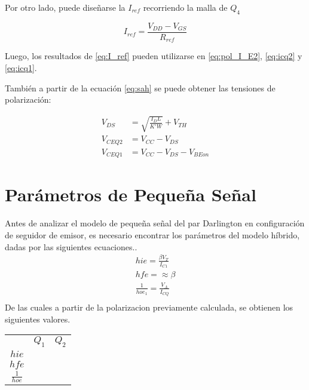 Por otro lado, puede diseñarse la $I_{ref}$ recorriendo la malla de $Q_4$

\begin{equation}
    I_{ref}=\frac{V_{DD}-V_{GS}}{R_{ref}}
    \label{eq:I_ref}
\end{equation}

Luego, los resultados de \eqref{eq:I_ref} pueden utilizarse en \eqref{eq:pol_I_E2}, \eqref{eq:icq2} y \eqref{eq:icq1}.

También a partir de la ecuación	 \eqref{eq:sah} se puede obtener las tensiones de polarización:

\begin{align}
    V_{DS} &= \sqrt{\frac{I_D L}{K' W}} + V_{TH}\\
    V_{CEQ2} &= V_{CC} - V_{DS} \\
    V_{CEQ1} &= V_{CC} - V_{DS} - V_{BEon}
\end{align}

\section{Parámetros de Pequeña Señal}

Antes de analizar el modelo de pequeña señal del par Darlington en configuración de seguidor de emisor, es necesario encontrar los parámetros del modelo híbrido, dadas por las siguientes ecuaciones..
\begin{align}
    hie = \frac{\beta V_T}{I_{C1}} \\
    hfe = \approx \beta \\
    \frac{1}{hoe_1} = \frac{V_{A}}{I_{CQ}} \\
\end{align}
De las cuales a partir de la polarizacion previamente calculada, se obtienen los siguientes valores.

\begin{table}
    \centering
    \begin{tabular}{|c|c|c|}
     & $Q_1$ & $Q_2$ \\
    $hie$           &    &     \\
    $hfe$           &    &      \\
    $\frac{1}{hoe}$ &    &      \\
    \end{tabular}
\end{table}




